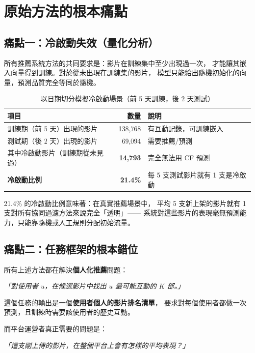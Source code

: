 \documentclass[12pt, a4paper]{article}
\begin{document}
\section{原始方法的根本痛點}
\label{sec:painpoints}

\subsection{痛點一：冷啟動失效（量化分析）}

所有推薦系統方法的共同要求是：影片在訓練集中至少出現過一次，
才能讓其嵌入向量得到訓練。對於從未出現在訓練集的影片，
模型只能給出隨機初始化的向量，預測品質完全等同於隨機。

\begin{table}[H]
\centering
\caption{以日期切分模擬冷啟動場景（前 5 天訓練，後 2 天測試）}
\small
\begin{tabular}{lrl}
\toprule
\textbf{項目} & \textbf{數量} & \textbf{說明} \\
\midrule
訓練期（前 5 天）出現的影片 & 138,768 & 有互動記錄，可訓練嵌入 \\
測試期（後 2 天）出現的影片 & 69,094  & 需要推薦/預測 \\
其中冷啟動影片（訓練期從未見過） & \textbf{14,793} & 完全無法用 CF 預測 \\
\midrule
\textbf{冷啟動比例} & \textbf{21.4\%} & 每 5 支測試影片就有 1 支是冷啟動 \\
\bottomrule
\end{tabular}
\end{table}

21.4\% 的冷啟動比例意味著：在真實推薦場景中，
平均 5 支新上架的影片就有 1 支對所有協同過濾方法來說完全「透明」——
系統對這些影片的表現毫無預測能力，只能靠隨機或人工規則分配初始流量。

\subsection{痛點二：任務框架的根本錯位}

所有上述方法都在解決\textbf{個人化推薦}問題：
\begin{center}
\textit{「對使用者 $u$，在候選影片中找出 $u$ 最可能互動的 $K$ 部。」}
\end{center}

這個任務的輸出是一個\textbf{使用者個人的影片排名清單}，
要求對每個使用者都做一次預測，且訓練時需要該使用者的歷史互動。

而平台運營者真正需要的問題是：
\begin{center}
\textit{「這支剛上傳的影片，在整個平台上會有怎樣的平均表現？」}
\end{center}
\end{document}
